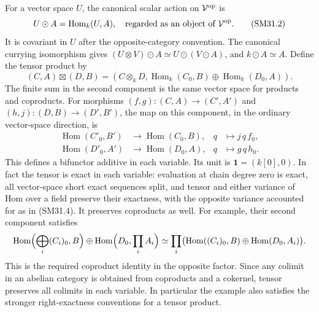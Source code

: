 \documentclass[11pt,a4paper]{article}
\theoremstyle{definition}\newtheorem{definition}[theorem]{Definition}
\theoremstyle{remark}\newtheorem{remark}[theorem]{Remark}
\begin{document}
For a vector space \(U\), the canonical scalar action on
\(\mathcal V^{\rm op}\) is
\[
             U\odot A=\operatorname{Hom}_k(U,A),
             \quad\text{regarded as an object of }\mathcal V^{\rm op}.
                                                               \tag{SM31.2}
\]
It is covariant in \(U\) after the opposite-category convention.
The canonical currying isomorphism gives
\((U\otimes V)\odot A\simeq U\odot(V\odot A)\),
and \(k\odot A\simeq A\).
Define the tensor product by
\[
 (C,A)\boxtimes(D,B)=
 \left(C\otimes_kD,
    \operatorname{Hom}_k(C_0,B)\oplus
    \operatorname{Hom}_k(D_0,A)\right).                    \tag{SM31.3}
\]
The finite sum in the second component is the same vector
space for products and coproducts.  For morphisms
\((f,g):(C,A)\to(C',A')\) and
\((h,j):(D,B)\to(D',B')\), the map on this component,
in the ordinary vector-space direction, is
\[
 \begin{aligned}
 \operatorname{Hom}(C'_0,B')&\longrightarrow\operatorname{Hom}(C_0,B),
                 &q&\longmapsto j\,q\,f_0,\\
 \operatorname{Hom}(D'_0,A')&\longrightarrow\operatorname{Hom}(D_0,A),
                 &q&\longmapsto g\,q\,h_0.
 \end{aligned}                                             \tag{SM31.4}
\]
This defines a bifunctor additive in each variable.
Its unit is \(\mathbf1=(k[0],0)\).
In fact the tensor is exact in each variable: evaluation at
chain degree zero is exact, all vector-space short exact
sequences split, and tensor and either variance of Hom over
a field preserve their exactness, with the opposite variance
accounted for as in (SM31.4).  It preserves coproducts as well.
For example, their second component satisfies
\[
 \operatorname{Hom}\Bigl(\bigoplus_i(C_i)_0,B\Bigr)
 \oplus\operatorname{Hom}\Bigl(D_0,\prod_iA_i\Bigr)
 \simeq\prod_i\bigl(\operatorname{Hom}((C_i)_0,B)
                 \oplus\operatorname{Hom}(D_0,A_i)\bigr).
\]
This is the required coproduct identity in the opposite
factor.  Since any colimit in an abelian category is obtained
from coproducts and a cokernel, tensor preserves all colimits
in each variable.  In particular the example also satisfies
the stronger right-exactness conventions for a tensor product.
\end{document}
